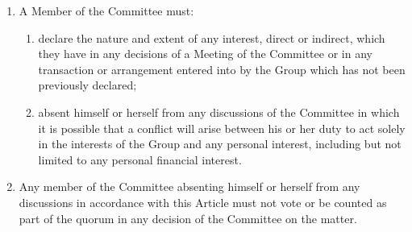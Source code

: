 \documentclass[12pt]{constitution}
\begin{document}

\label{article:conflicts-interest-loyalities}

\begin{enumerate}
    \item A Member of the Committee must:
    \begin{enumerate}
        \item declare the nature and extent of any interest, direct or indirect, which they have in any decisions of a Meeting of the Committee or in any transaction or arrangement entered into by the Group which has not been previously declared;
        \item absent himself or herself from any discussions of the Committee in which it is possible that a conflict will arise between his or her duty to act solely in the interests of the Group and any personal interest, including but not limited to any personal financial interest.
    \end{enumerate}

    \item Any member of the Committee absenting himself or herself from any discussions in accordance with this Article must not vote or be counted as part of the quorum in any decision of the Committee on the matter.
\end{enumerate}


\label{article:disciplinary-action}
\end{document}
